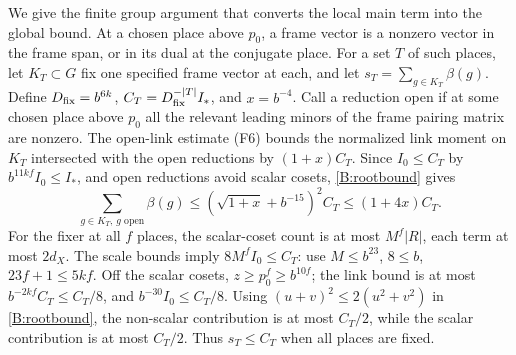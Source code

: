 We give the finite group argument that converts the local
main term into the global bound. At a chosen place above \(p_0\),
a frame vector is a nonzero vector in the frame span, or in its
dual at the conjugate place. For a set \(T\) of such places,
let \(K_T\subset G\) fix one specified frame vector at each,
and let \(s_T=\sum_{g\in K_T}\beta(g)\). Define
\(D_{\rm fix}=b^{6k}\), \(C_T=D_{\rm fix}^{-|T|}I_*\), and \(x=b^{-4}\).
Call a reduction open if at some chosen place above \(p_0\) all
the relevant leading minors of the frame pairing matrix are
nonzero. The open-link estimate (F6) bounds the normalized
link moment on \(K_T\) intersected with the open reductions by
\((1+x)C_T\).
Since \(I_0\le C_T\) by \(b^{11kf}I_0\le I_*\), and
open reductions avoid scalar cosets, \eqref{B:rootbound} gives
\[
 \sum_{g\in K_T,\,g\text{ open}}\beta(g)
 \le (\sqrt{1+x}+b^{-15})^2 C_T\le(1+4x)C_T.
\]
For the fixer at all \(f\) places, the scalar-coset count is
at most \(M^f|R|\), each term at most \(2d_X\).
The scale bounds imply \(8M^f I_0\le C_T\):
use \(M\le b^{23}\), \(8\le b\), \(23f+1\le5kf\).
Off the scalar cosets, \(z\ge p_0^f\ge b^{10f}\);
the link bound is at most \(b^{-2kf}C_T\le C_T/8\),
and \(b^{-30}I_0\le C_T/8\).
Using \((u+v)^2\le2(u^2+v^2)\) in \eqref{B:rootbound},
the non-scalar contribution is at most \(C_T/2\), while the
scalar contribution is at most \(C_T/2\). Thus \(s_T\le C_T\)
when all places are fixed.

